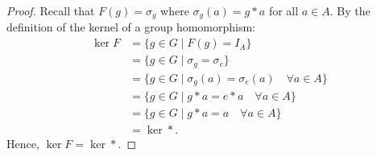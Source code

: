 \begin{proof}
Recall that $F(g) = \sigma_g$ where $\sigma_g(a) = g * a$ for all $a \in A$. By the definition of the kernel of a group homomorphism:
\begin{align*}
\ker F &= \{g \in G \mid F(g) = I_A\} \\
&= \{g \in G \mid \sigma_g = \sigma_e\} \\
&= \{g \in G \mid \sigma_g(a) = \sigma_e(a) \quad \forall a \in A\} \\
&= \{g \in G \mid g * a = e * a \quad \forall a \in A\} \\
&= \{g \in G \mid g * a = a \quad \forall a \in A\} \\
&= \ker *.
\end{align*}
Hence, $\ker F = \ker *$.
\end{proof}
